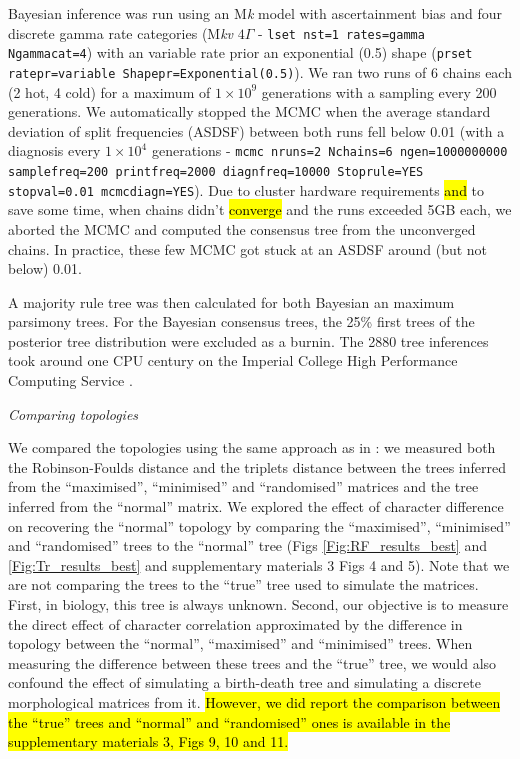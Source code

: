 \documentclass[12pt,letterpaper]{article}
\renewcommand{\subsection}[1]{%
\bigskip
\begin{center}
\begin{large}
\normalfont\itshape #1
\end{large}
\end{center}}
\begin{document}
Bayesian inference was run using an M\textit{k} model with ascertainment bias and four discrete gamma rate categories (M\textit{kv} $4\Gamma$ - \texttt{lset nst=1 rates=gamma Ngammacat=4}) with an variable rate prior an exponential (0.5) shape (\texttt{prset ratepr=variable Shapepr=Exponential(0.5)}).
We ran two runs of 6 chains each (2 hot, 4 cold) for a maximum of $1\times10^9$ generations with a sampling every 200 generations.
We automatically stopped the MCMC when the average standard deviation of split frequencies (ASDSF) between both runs fell below 0.01 (with a diagnosis every $1\times10^4$ generations - \texttt{mcmc nruns=2 Nchains=6 ngen=1000000000 samplefreq=200 printfreq=2000 diagnfreq=10000 Stoprule=YES stopval=0.01 mcmcdiagn=YES}).
Due to cluster hardware requirements \hl{and} to save some time, when chains didn't \hl{converge} and the runs exceeded 5GB each, we aborted the MCMC and computed the consensus tree from the unconverged chains.
In practice, these few MCMC got stuck at an ASDSF around (but not below) 0.01.

A majority rule tree was then calculated for both Bayesian an maximum parsimony trees.
For the Bayesian consensus trees, the 25\% first trees of the posterior tree distribution were excluded as a burnin.
The 2880 tree inferences took around one CPU century on the Imperial College High Performance Computing Service \citep[2-3GHz clock rate;][]{HPC}.

\subsection{Comparing topologies}
We compared the topologies using the same approach as in \cite{Guillerme2016146}: we measured both the Robinson-Foulds distance \citep{RF1981} and the triplets distance \citep{dobson1975triplets} between the trees inferred from the ``maximised'', ``minimised'' and ``randomised'' matrices and the tree inferred from the ``normal'' matrix.
We explored the effect of character difference on recovering the ``normal'' topology by comparing the ``maximised'', ``minimised'' and ``randomised'' trees to the ``normal'' tree (Figs \ref{Fig:RF_results_best} and \ref{Fig:Tr_results_best} and supplementary materials 3 Figs 4 and 5).
Note that we are not comparing the trees to the ``true'' tree used to simulate the matrices.
First, in biology, this tree is always unknown.
Second, our objective is to measure the direct effect of character correlation approximated by the difference in topology between the ``normal'', ``maximised'' and ``minimised'' trees.
When measuring the difference between these trees and the ``true'' tree, we would also confound the effect of simulating a birth-death tree and simulating a discrete morphological matrices from it.
\hl{However, we did report the comparison between the ``true'' trees and ``normal'' and ``randomised'' ones is available in the supplementary materials 3, Figs 9, 10 and 11.}
\end{document}
